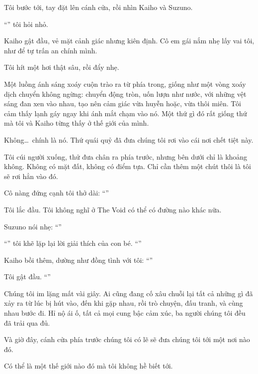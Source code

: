 \documentclass[../main.tex]{subfiles}
\begin{document}
Tôi bước tới, tay đặt lên cánh cửa, rồi nhìn Kaiho và Suzuno.

``'' tôi hỏi nhỏ.

Kaiho gật đầu, vẻ mặt cảnh giác nhưng kiên định. Cô em gái nắm nhẹ lấy vai tôi, như để tự trấn an chính mình.

Tôi hít một hơi thật sâu, rồi đẩy nhẹ.

Một luồng ánh sáng xoáy cuộn trào ra từ phía trong, giống như một vòng xoáy dịch chuyển không ngừng: chuyển động tròn, uốn lượn như nước, với những vệt sáng đan xen vào nhau, tạo nên cảm giác vừa huyễn hoặc, vừa thôi miên. Tôi cảm thấy lạnh gáy ngay khi ánh mắt chạm vào nó. Một thứ gì đó rất giống thứ mà tôi và Kaiho từng thấy ở thế giới của mình.

Không\dots\ chính là nó. Thứ quái quỷ đã đưa chúng tôi rơi vào cái nơi chết tiệt này.

Tôi cúi người xuống, thử đưa chân ra phía trước, nhưng bên dưới chỉ là khoảng không. Không có mặt đất, không có điểm tựa. Chỉ cần thêm một chút thôi là tôi sẽ rơi hẳn vào đó.

Cô nàng đứng cạnh tôi thở dài: ``''

Tôi lắc đầu. Tôi không nghĩ ở The Void có thể có đường nào khác nữa.

Suzuno nói nhẹ: ``''

``'' tôi khẽ lặp lại lời giải thích của con bé. ``''

Kaiho bồi thêm, dường như đồng tình với tôi: ``''

Tôi gật đầu. ``''

Chúng tôi im lặng mất vài giây. Ai cũng đang cố xâu chuỗi lại tất cả những gì đã xảy ra từ lúc bị hút vào, đến khi gặp nhau, rồi trò chuyện, đấu tranh, và cùng nhau bước đi. Hỉ nộ ái ố, tất cả mọi cung bậc cảm xúc, ba người chúng tôi đều đã trải qua đủ.

Và giờ đây, cánh cửa phía trước chúng tôi có lẽ sẽ đưa chúng tôi tới một nơi nào đó.

Có thể là một thế giới nào đó mà tôi không hề biết tới.
\end{document}
